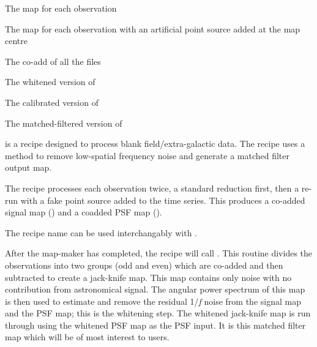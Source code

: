 \begin{aligndesc}
\item[\file{sYYYYMMDD*\_fmos}]
The map for each observation

\item[\file{sYYYYMMDD*\_mappsf}] The map for each observation with an
  artificial point source added at the map centre

\item[\file{gsYYYYMMD*\_wmos}] The co-add of all the 
  files

\item[\file{gsYYYYMMD*\_whiten}] The whitened version of 

\item[\file{gsYYYYMMD*\_cal}] The calibrated version of

\item[\file{gsYYYYMMD*\_mf}] The matched-filtered version of
\end{aligndesc}

 is a recipe designed to
process blank field/extra-galactic data. The recipe uses a
method to remove low-spatial frequency noise and generate a matched
filter output map.

The recipe processes each observation twice, a standard reduction
first, then a re-run with a fake point source added to the time
series. This produces a co-added signal map () and a
coadded PSF map ().

\begin{tip}
The recipe name  can be used
interchangably with  .
\end{tip}


After the map-maker has completed, the recipe will call
. This
routine divides the observations into two groups (odd and even) which
are co-added and then subtracted to create a jack-knife map. This map
contains only noise with no contribution from astronomical signal. The
angular power spectrum of this map is then used to estimate and remove
the residual 1/\emph{f} noise from the signal map and the PSF map;
this is the whitening step. The whitened jack-knife map is run through
using the whitened PSF map as the PSF input. It is this matched filter
map which will be of most interest to users.

